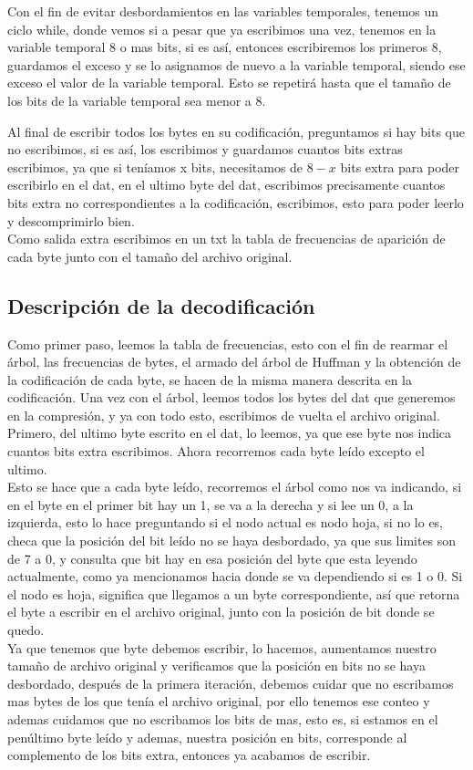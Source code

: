 \documentclass[12 pt]{report}
\begin{document}
Con el fin de evitar desbordamientos en las variables temporales, tenemos un ciclo while, donde vemos si a pesar que ya escribimos una vez, tenemos en la variable temporal 8 o mas bits, si es así, entonces escribiremos los primeros 8, guardamos el exceso y se lo asignamos de nuevo a la variable temporal, siendo ese exceso el valor de la variable temporal. Esto se repetirá hasta que el tamaño de los bits de la variable temporal sea menor a 8.

Al final de escribir todos los bytes en su codificación, preguntamos si hay bits que no escribimos, si es así, los escribimos y guardamos cuantos bits extras escribimos, ya que si teníamos x bits, necesitamos de $8-x$ bits extra para poder escribirlo en el dat, en el ultimo byte del dat, escribimos precisamente cuantos bits extra no correspondientes a la codificación, escribimos, esto para poder leerlo y descomprimirlo bien.\\
Como salida extra escribimos en un txt la tabla de frecuencias de aparición de cada byte junto con el tamaño del archivo original.

\subsection{Descripción de la decodificación}

Como primer paso, leemos la tabla de frecuencias, esto con el fin de rearmar el árbol, las frecuencias de bytes, el armado del árbol de Huffman y la obtención de la codificación de cada byte, se hacen de la misma manera descrita en la codificación. Una vez con el árbol, leemos todos los bytes del dat que generemos en la compresión, y ya con todo esto, escribimos de vuelta el archivo original. Primero, del ultimo byte escrito en el dat, lo leemos, ya que ese byte nos indica cuantos bits extra escribimos. Ahora recorremos cada byte leído excepto el ultimo.\\
Esto se hace que a cada byte leído, recorremos el árbol como nos va indicando, si en el byte en el primer bit hay un 1, se va a la derecha y si lee un 0, a la izquierda, esto lo hace preguntando si el nodo actual es nodo hoja, si no lo es, checa que la posición del bit leído no se haya desbordado, ya que sus limites son de 7 a 0, y consulta que bit hay en esa posición del byte que esta leyendo actualmente, como ya mencionamos hacia donde se va dependiendo si es 1 o 0. Si el nodo es hoja, significa que llegamos a un byte correspondiente, así que retorna el byte a escribir en el archivo original, junto con la posición de bit donde se quedo. \\
Ya que tenemos que byte debemos escribir, lo hacemos, aumentamos nuestro tamaño de archivo original y verificamos que la posición en bits no se haya desbordado, después de la primera iteración, debemos cuidar que no escribamos mas bytes de los que tenía el archivo original, por ello tenemos ese conteo y ademas cuidamos que no escribamos los bits de mas, esto es, si estamos en el penúltimo byte leído y ademas, nuestra posición en bits, corresponde al complemento de los bits extra, entonces ya acabamos de escribir.
\end{document}
